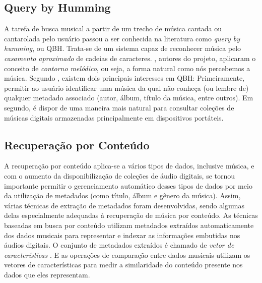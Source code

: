 \subsection{Query by Humming} \label{subsec:qbh}
A tarefa de busca musical a partir de um trecho de música cantada ou cantarolada pelo usuário passou a ser conhecida na literatura como \textit{query by humming}, ou QBH. Trata-se de um sistema capaz de reconhecer música pelo \textit{casamento aproximado} de cadeias de caracteres. \cite{ghias1995}, autores do projeto, aplicaram o conceito de \textit{contorno melódico}, ou seja, a forma natural como nós percebemos a música. Segundo \cite{santos2011}, existem dois principais interesses em QBH: Primeiramente, permitir ao usuário identificar uma música da qual não conheça (ou lembre de) qualquer metadado associado (autor, álbum, título da música, entre outros). Em segundo, é dispor de uma maneira mais natural para consultar coleções de músicas digitais armazenadas principalmente em dispositivos portáteis.

\subsection{Recuperação por Conteúdo} \label{subsec:rpc}
A recuperação por conteúdo aplica-se a vários tipos de dados, inclusive música, e com o aumento da disponibilização de coleções de áudio digitais, se tornou importante permitir o gerenciamento automático desses tipos de dados por meio da utilização de metadados (como título, álbum e gênero da música). Assim, várias técnicas de extração de metadados foram desenvolvidas, sendo algumas delas especialmente adequadas à recuperação de música por conteúdo. As técnicas baseadas em busca por conteúdo utilizam metadados extraídos automaticamente dos dados musicais para representar e indexar as informações embutidas nos áudios digitais. O conjunto de metadados extraídos é chamado de \textit{vetor de características} \cite{tzanetakis2002}. E as operações de comparação entre dados musicais utilizam os vetores de características para medir a similaridade do conteúdo presente nos dados que eles representam.

